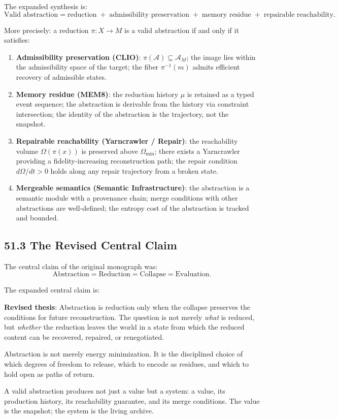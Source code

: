 \documentclass[12pt,letterpaper]{article}
\theoremstyle{remark}
\begin{document}
The expanded synthesis is:
\[
\boxed{
\text{Valid abstraction} =
\text{reduction} \;+\;
\text{admissibility preservation} \;+\;
\text{memory residue} \;+\;
\text{repairable reachability}.
}
\]

More precisely: a reduction $\pi: X \to M$ is a valid abstraction
if and only if it satisfies:

\begin{enumerate}
\item \textbf{Admissibility preservation (CLIO)}: $\pi(\mathcal{A}) \subseteq \mathcal{A}_M$; the image lies within the admissibility
  space of the target; the fiber $\pi^{-1}(m)$ admits efficient
  recovery of admissible states.

\item \textbf{Memory residue (MEM\textbar{}8)}: the reduction
  history $\mu$ is retained as a typed event sequence; the
  abstraction is derivable from the history via constraint
  intersection; the identity of the abstraction is the trajectory,
  not the snapshot.

\item \textbf{Repairable reachability (Yarncrawler / Repair)}: the
  reachability volume $\Omega(\pi(x))$ is preserved above
  $\Omega_{\min}$; there exists a Yarncrawler providing a
  fidelity-increasing reconstruction path; the repair condition
  $d\Omega/dt > 0$ holds along any repair trajectory from a broken
  state.

\item \textbf{Mergeable semantics (Semantic Infrastructure)}: the
  abstraction is a semantic module with a provenance chain; merge
  conditions with other abstractions are well-defined; the entropy
  cost of the abstraction is tracked and bounded.
\end{enumerate}

\subsection{51.3 The Revised Central Claim}

The central claim of the original monograph was:
\[
\text{Abstraction} = \text{Reduction} = \text{Collapse} =
\text{Evaluation.}
\]

The expanded central claim is:

\begin{notebox}
\textbf{Revised thesis}: Abstraction is reduction only when the
collapse preserves the conditions for future reconstruction. The
question is not merely \emph{what} is reduced, but \emph{whether}
the reduction leaves the world in a state from which the reduced
content can be recovered, repaired, or renegotiated.

Abstraction is not merely energy minimization. It is the
disciplined choice of which degrees of freedom to release, which
to encode as residues, and which to hold open as paths of return.

A valid abstraction produces not just a value but a system:
a value, its production history, its reachability guarantee, and
its merge conditions. The value is the snapshot; the system is
the living archive.
\end{notebox}
\end{document}
